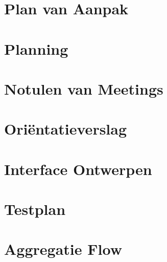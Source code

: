 \documentclass[dutch]{style/tudelft-report}
\begin{document}
\appendix



\chapter{Plan van Aanpak} \label{ch:plan-van-aanpak} 

\chapter{Planning} \label{ch:planning} 

\chapter{Notulen van Meetings} \label{ch:notulen-van-meetings} 

\chapter{Oriëntatieverslag} \label{ch:orientatieverslag} 

\chapter{Interface Ontwerpen} \label{ch:interface-ontwerpen} 

\chapter{Testplan} \label{ch:testplan} 

\chapter{Aggregatie Flow} \label{ch:aggregation-flow}
\end{document}
